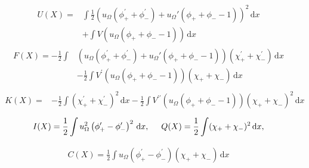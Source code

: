 \documentclass[vecphys]{svmult}		%
\begin{document}
{\begin{eqnarray*}
U(X)=&\int \frac{1}{2}\left( u_{\Omega} \left( \phi _{+}^{\prime
}+\phi _{-}^{\prime }\right) +u_{\Omega}'(\phi _{+}+\phi _{-}-1)\right) ^{2}\,\mathrm{d}x
\\
&+\int V(u_{\Omega}(\phi _{+}+\phi _{-}-1))\,\mathrm{d}x
\end{eqnarray*}
\begin{eqnarray*}
\begin{aligned}
F(X)=-\frac{1}{2}\int &(u_{\Omega} \left( \phi _{+}^{\prime
}+\phi _{-}^{\prime }\right) +u_{\Omega}'(\phi _{+}+\phi _{-}-1))(\chi _{+}^{\prime }+\chi
_{-}^{\prime })\,\mathrm{d}x\\
 &-\frac{1}{2}\int V^{\prime }(u_{\Omega}(\phi _{+}+\phi _{-}-1))(\chi
_{+}+\chi _{-})\,\mathrm{d}x
\end{aligned}
\end{eqnarray*}
\begin{eqnarray*}
\begin{aligned}
K(X)=&-\frac{1}{2}\int(\chi _{+}^{\prime }+\chi _{-}^{\prime
})^{2}\,\mathrm{d}x
-\frac{1}{2}\int V^{\prime \prime }(u_{\Omega}(\phi _{+}+\phi
_{-}-1))(\chi _{+}+\chi _{-})^{2}\,\mathrm{d}x
\end{aligned}
\end{eqnarray*}
\begin{eqnarray*}
I(X)=\frac{1}{2}\int u_{\Omega}^2\left( \phi _{+}^{\prime }-\phi
_{-}^{\prime }\right) ^{2}\,\mathrm{d}x, \hspace{0.5cm}Q(X)=\frac{1}{2}\int (\chi _{+}+\chi _{-})^{2}\,\mathrm{d}x, 
\end{eqnarray*}

\begin{eqnarray*}
C(X)=\frac{1}{2}\int u_{\Omega}\left( \phi _{+}^{\prime }-\phi _{-}^{\prime }\right) (\chi
_{+}+\chi _{-})\,\mathrm{d}x
\end{eqnarray*}
























\begin{thebibliography}{99.}
%


\end{thebibliography}}
\end{document}
